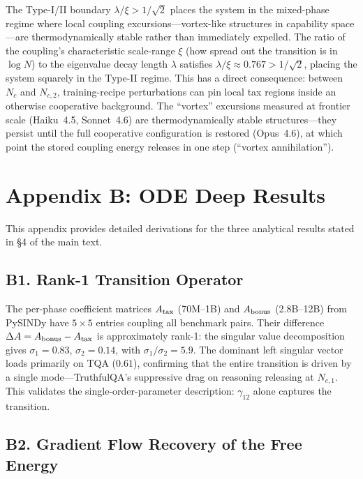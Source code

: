 \documentclass[11pt]{article}
\begin{document}
The Type-I/II boundary $\lambda/\xi > 1/\sqrt{2}$ places the system in the mixed-phase regime where local coupling excursions---vortex-like structures in capability space---are thermodynamically stable rather than immediately expelled.
The ratio of the coupling's characteristic scale-range $\xi$ (how spread out the transition is in $\log N$) to the eigenvalue decay length $\lambda$ satisfies $\lambda/\xi \approx 0.767 > 1/\sqrt{2}$, placing the system squarely in the Type-II regime.
This has a direct consequence: between $N_c$ and $N_{c,2}$, training-recipe perturbations can pin local tax regions inside an otherwise cooperative background.
The ``vortex'' excursions measured at frontier scale (Haiku~4.5, Sonnet~4.6) are thermodynamically stable structures---they persist until the full cooperative configuration is restored (Opus~4.6), at which point the stored coupling energy releases in one step (``vortex annihilation'').

\section*{Appendix B: ODE Deep Results}
\label{app:ode}

This appendix provides detailed derivations for the three analytical results stated in \S4 of the main text.

\subsection*{B1. Rank-1 Transition Operator}

The per-phase coefficient matrices $A_{\rm tax}$ (70M--1B) and $A_{\rm bonus}$ (2.8B--12B) from PySINDy have $5{\times}5$ entries coupling all benchmark pairs.
Their difference $\Delta A = A_{\rm bonus} - A_{\rm tax}$ is approximately rank-1: the singular value decomposition gives $\sigma_1 = 0.83$, $\sigma_2 = 0.14$, with $\sigma_1/\sigma_2 = 5.9$.
The dominant left singular vector loads primarily on TQA ($0.61$), confirming that the entire transition is driven by a single mode---TruthfulQA's suppressive drag on reasoning releasing at $N_{c,1}$.
This validates the single-order-parameter description: $\gamma_{12}$ alone captures the transition.

\subsection*{B2. Gradient Flow Recovery of the Free Energy}
\end{document}

